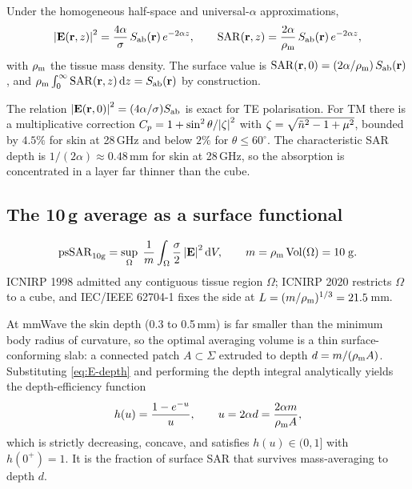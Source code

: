 \begin{lemma}\label{lem:depth-profile}
Under the homogeneous half-space and universal-$\alpha$ approximations,
\begin{equation}\label{eq:E-depth}
  \abs{\mathbf{E}(\mathbf{r},z)}^2 = \frac{4\alpha}{\sigma}\,S_{\mathrm{ab}}(\mathbf{r})\,e^{-2\alpha z},
  \qquad
  \mathrm{SAR}(\mathbf{r},z) = \frac{2\alpha}{\rho_{\mathrm{m}}}\,S_{\mathrm{ab}}(\mathbf{r})\,e^{-2\alpha z},
\end{equation}
with $\rho_{\mathrm{m}}$ the tissue mass density. The surface value is
$\mathrm{SAR}(\mathbf{r},0) = (2\alpha/\rho_{\mathrm{m}})\,S_{\mathrm{ab}}(\mathbf{r})$, and
$\rho_{\mathrm{m}}\int_0^\infty \mathrm{SAR}(\mathbf{r},z)\,\mathrm{d} z = S_{\mathrm{ab}}(\mathbf{r})$ by construction.
\end{lemma}

The relation $\abs{\mathbf{E}(\mathbf{r},0)}^2 = (4\alpha/\sigma)S_{\mathrm{ab}}$ is exact for TE
polarisation. For TM there is a multiplicative correction
$C_p = 1 + \sin^2\theta/\abs{\zeta}^2$ with
$\zeta = \sqrt{\tilde{n}^2 - 1 + \mu^2}$, bounded by $4.5\%$ for skin at 28\,GHz and
below $2\%$ for $\theta\le 60^\circ$. The characteristic SAR depth is
$1/(2\alpha) \approx 0.48$\,mm for skin at 28\,GHz, so the absorption is
concentrated in a layer far thinner than the cube.

\subsection{The 10\,g average as a surface functional}
\label{sec:pssar-functional}

\begin{definition}\label{def:pssar}
\begin{equation}\label{eq:pssar-def}
  \mathrm{psSAR}_{10\mathrm{g}} = \sup_{\Omega}\;\frac{1}{m}\int_\Omega \frac{\sigma}{2}\,\abs{\mathbf{E}}^2\,\mathrm{d} V,
  \qquad m = \rho_{\mathrm{m}}\operatorname{Vol}(\Omega) = 10\;\mathrm{g}.
\end{equation}
ICNIRP 1998 admitted any contiguous tissue region $\Omega$; ICNIRP 2020
restricts $\Omega$ to a cube, and IEC/IEEE 62704-1 fixes the side at
$L = (m/\rho_{\mathrm{m}})^{1/3} = 21.5$\,mm.
\end{definition}

At mmWave the skin depth (0.3 to 0.5\,mm) is far smaller than the minimum body
radius of curvature, so the optimal averaging volume is a thin
surface-conforming slab: a connected patch $A\subset\Sigma$ extruded to depth
$d = m/(\rho_{\mathrm{m}} A)$. Substituting \cref{eq:E-depth} and performing the depth
integral analytically yields the depth-efficiency function
\begin{equation}\label{eq:h-def}
  h(u) = \frac{1 - e^{-u}}{u}, \qquad u = 2\alpha d = \frac{2\alpha m}{\rho_{\mathrm{m}} A},
\end{equation}
which is strictly decreasing, concave, and satisfies $h(u)\in(0,1]$ with
$h(0^+)=1$. It is the fraction of surface SAR that survives mass-averaging to
depth $d$.

